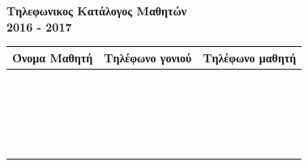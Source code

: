 \documentclass[twoside,nofonts,internet]{askhseis}
\begin{document}
\begin{center}
{\LARGE \textbf{Τηλεφωνικος Κατάλογος Μαθητών}\\
\textbf{2016 - 2017}}
\end{center}
\begin{tabular}{|>{\centering\arraybackslash}p{5cm}|>{\centering\arraybackslash}p{5cm}|>{\centering\arraybackslash}p{5cm}|}
\hline \rule[-2ex]{0pt}{5ex}
\textbf{Όνομα Μαθητή} & \textbf{Τηλέφωνο γονιού} & \textbf{Τηλέφωνο μαθητή} \\ 
\hline \rule[-2ex]{0pt}{5ex}
 &  &  \\ 
\hline \rule[-2ex]{0pt}{5ex}
 &  &  \\ 
\hline \rule[-2ex]{0pt}{5ex}
 &  &  \\ 
\hline \rule[-2ex]{0pt}{5ex}
 &  &  \\ 
\hline \rule[-2ex]{0pt}{5ex}
 &  &  \\ 
\hline \rule[-2ex]{0pt}{5ex}
 &  &  \\ 
\hline \rule[-2ex]{0pt}{5ex}
 &  &  \\ 
\hline \rule[-2ex]{0pt}{5ex}
 &  &  \\ 
\hline \rule[-2ex]{0pt}{5ex}
 &  &  \\ 
\hline \rule[-2ex]{0pt}{5ex}
 &  &  \\ 
\hline \rule[-2ex]{0pt}{5ex}
 &  &  \\ 
\hline \rule[-2ex]{0pt}{5ex}
 &  &  \\ 
\hline \rule[-2ex]{0pt}{5ex}
 &  &  \\ 
\hline \rule[-2ex]{0pt}{5ex}
 &  &  \\ 
\hline \rule[-2ex]{0pt}{5ex}
 &  &  \\ 
\hline \rule[-2ex]{0pt}{5ex}
 &  &  \\ 
\hline \rule[-2ex]{0pt}{5ex}
 &  &  \\ 
\hline \rule[-2ex]{0pt}{5ex}
 &  &  \\ 
\hline \rule[-2ex]{0pt}{5ex}
 &  &  \\ 
\hline \rule[-2ex]{0pt}{5ex}
 &  &  \\ 
\hline \rule[-2ex]{0pt}{5ex}
 &  &  \\ 
\hline 
\end{tabular} 
\end{document}
